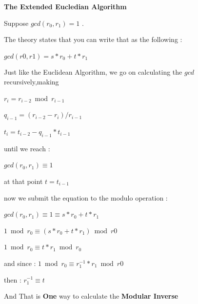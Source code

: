 \documentclass{slides}
\begin{document}
\begin{center}
\textbf{\Large The Extended Eucledian Algorithm}
\end{center}
\begin{center}
Suppose $ gcd(r_{0},r_{1}) = 1 $ .
\end{center}
\begin{center}
The theory states that you can write that as the following : 
\end{center}
\begin{center}
$ gcd(r0,r1) = s*r_{0} + t*r_{1} $
\end{center}
\begin{center}
Just like the Euclidean Algorithm, we go on calculating the $ gcd $ recursively,making 
\end{center}
\begin{center}
$r_{i}  = r_{i-2} \bmod r_{i-1}$
\end{center}
\begin{center}
$q_{i-1} = (r_{i-2} - r_{i} )/r_{i-1}$
\end{center}
\begin{center}
$ t_{i} = t_{i-2}-q_{i-1}*t_{i-1} $
\end{center}
\begin{center}
until we reach : 
\end{center}
\begin{center}
 $ gcd(r_{0},r_{1}) \equiv 1 $
\end{center}
\begin{center}
at that point $ t=t_{i-1} $
\end{center}
\begin{center}
now we submit the equation to the modulo operation :
\end{center}
\begin{center}
$ gcd(r_{0},r_{1}) \equiv 1 \equiv s*r_{0} + t*r_{1} $
\end{center}
\begin{center}
$ 1 \bmod r_{0} \equiv (s*r_{0} + t*r_{1}) \bmod r0 $
\end{center}
\begin{center}
$ 1 \bmod r_{0} \equiv t*r_{1} \bmod r_{0} $
\end{center}
\begin{center}
and since : $ 1 \bmod r_{0} \equiv r_{1}^{-1}*r_{1} \bmod r0 $
\end{center}
\begin{center}
then : $ r_{1}^{-1} \equiv t $
\end{center}
\begin{center}
And That is \textbf{One} way to calculate the \textbf{Modular Inverse}
\end{center}
\end{document}
